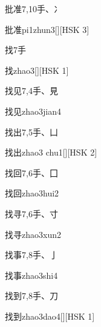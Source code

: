 \begin{entry}{批准}{7,10}{⼿、⼎}
  \begin{phonetics}{批准}{pi1zhun3}[][HSK 3]
  \end{phonetics}
\end{entry}

\begin{entry}{找}{7}{⼿}
  \begin{phonetics}{找}{zhao3}[][HSK 1]
  \end{phonetics}
\end{entry}

\begin{entry}{找见}{7,4}{⼿、⾒}
  \begin{phonetics}{找见}{zhao3jian4}
  \end{phonetics}
\end{entry}

\begin{entry}{找出}{7,5}{⼿、⼐}
  \begin{phonetics}{找出}{zhao3 chu1}[][HSK 2]
  \end{phonetics}
\end{entry}

\begin{entry}{找回}{7,6}{⼿、⼞}
  \begin{phonetics}{找回}{zhao3hui2}
  \end{phonetics}
\end{entry}

\begin{entry}{找寻}{7,6}{⼿、⼨}
  \begin{phonetics}{找寻}{zhao3xun2}
  \end{phonetics}
\end{entry}

\begin{entry}{找事}{7,8}{⼿、⼅}
  \begin{phonetics}{找事}{zhao3shi4}
  \end{phonetics}
\end{entry}

\begin{entry}{找到}{7,8}{⼿、⼑}
  \begin{phonetics}{找到}{zhao3dao4}[][HSK 1]
  \end{phonetics}
\end{entry}

